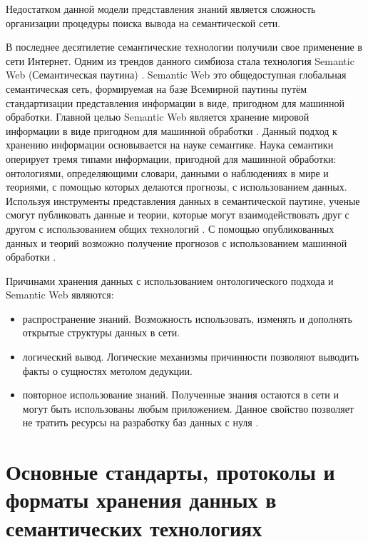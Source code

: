 Недостатком данной модели представления знаний является сложность организации процедуры поиска вывода на семантической сети.

В последнее десятилетие семантические технологии получили свое применение в сети Интернет. Одним из трендов данного симбиоза стала технология Semantic Web (Семантическая паутина) \cite{shadbolt2006semantic}. Semantic Web это общедоступная глобальная семантическая сеть, формируемая на базе Всемирной паутины путём стандартизации представления информации в виде, пригодном для машинной обработки. Главной целью Semantic Web является хранение мировой информации в виде пригодном для машинной обработки \cite{berners2001semantic}. Данный подход к хранению информации основывается на науке семантике. Наука семантики оперирует тремя типами информации, пригодной для машинной обработки: онтологиями, определяющими словари, данными о наблюдениях в мире и теориями, с помощью которых делаются прогнозы, с использованием данных. Используя инструменты представления данных в семантической паутине, ученые смогут публиковать данные и теории, которые могут взаимодействовать друг с другом с использованием общих технологий \cite{hendler2003science}. С помощью опубликованных данных и теорий возможно получение прогнозов с использованием машинной обработки \cite{poole2008semantic}. 

Причинами хранения данных с использованием онтологического подхода и Semantic Web являются:

\begin{itemize}
\item распространение знаний. Возможность использовать, изменять и дополнять открытые структуры данных в сети.
\item логический вывод. Логические механизмы причинности позволяют выводить факты о сущностях метолом дедукции.
\item повторное использование знаний. Полученные знания остаются в сети и могут быть использованы любым приложением. Данное свойство позволяет не тратить ресурсы на разработку баз данных с нуля \cite{wang2004ontology}. 
\end{itemize}



\section{Основные стандарты, протоколы и форматы хранения данных в семантических технологиях} \label{sect1_4}

